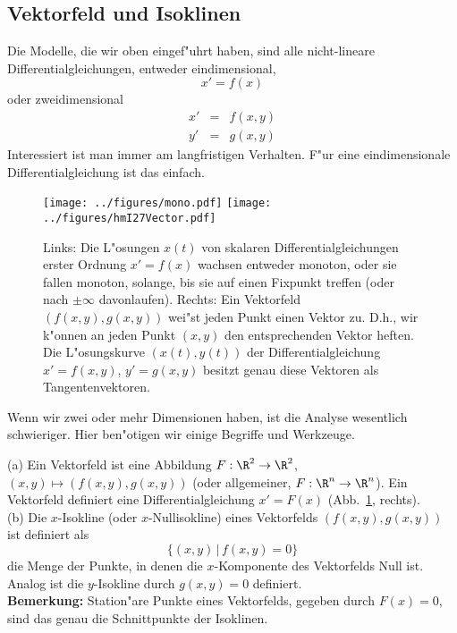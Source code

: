 \subsection{Vektorfeld und Isoklinen}

Die Modelle, die wir oben eingef"uhrt haben, sind alle nicht-lineare 
Differentialgleichungen, entweder eindimensional,
$$ x' = f(x)$$
oder zweidimensional
\begin{eqnarray*}
x' & = & f(x,y)\\
y' &=& g(x,y)
\end{eqnarray*}
Interessiert ist man immer am langfristigen Verhalten. F"ur eine eindimensionale 
Differentialgleichung ist das einfach.
\begin{figure}
\begin{center}
\texttt{[image: ../figures/mono.pdf]}
\texttt{[image: ../figures/hmI27Vector.pdf]}
\end{center}
\caption{Links: Die L"osungen $x(t)$ von skalaren Differentialgleichungen erster Ordnung $x'=f(x)$ 
wachsen entweder monoton, oder sie fallen monoton, solange, bis sie auf einen Fixpunkt treffen (oder nach $\pm\infty$ davonlaufen). 
Rechts: Ein Vektorfeld $(f(x,y), g(x,y))$ wei"st jeden Punkt einen Vektor zu. D.h., wir k"onnen an jeden Punkt $(x,y)$ den entsprechenden Vektor heften. Die L"osungskurve $(x(t),y(t))$ der Differentialgleichung $x'=f(x,y)$, 
$y'=g(x,y)$ besitzt genau diese Vektoren als Tangentenvektoren.}\label{odeMono}
\end{figure}


Wenn wir zwei oder mehr Dimensionen haben, ist die Analyse wesentlich schwieriger. 
Hier ben"otigen wir einige Begriffe und Werkzeuge. 

\begin{sdefi} (a) Ein Vektorfeld ist eine Abbildung 
$F:\R^2\rightarrow\R^2$, $(x,y)\mapsto(f(x,y), g(x,y))$  
(oder allgemeiner, $F:\R^n\rightarrow\R^n$). Ein Vektorfeld definiert eine
Differentialgleichung $x' = F(x)$ (Abb.~\ref{odeMono}, rechts). \\
(b) Die $x$-Isokline (oder $x$-Nullisokline) eines Vektorfelds $(f(x,y), g(x,y))$ 
ist definiert als
$$\{(x,y)\,|\, f(x,y)=0\}$$
die Menge der Punkte, in denen die $x$-Komponente des Vektorfelds Null ist. 
Analog ist die $y$-Isokline durch $g(x,y)=0$ definiert.\\
{\bf Bemerkung:}  Station"are Punkte eines Vektorfelds, gegeben durch $F(x)=0$, 
 sind das genau die  Schnittpunkte der Isoklinen.
\end{sdefi}

